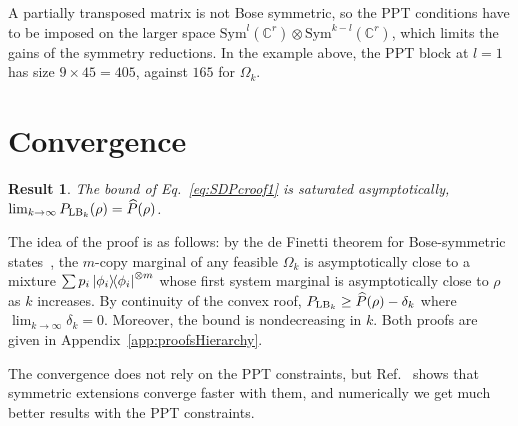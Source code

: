 \documentclass[11pt,a4paper]{report}
\newcommand{\C}{\mathds{C}}
\newtheorem{result}[theorem]{Result}
\newcounter{reptag}
\newif\iftags \tagsfalse   %
\newcommand{\reptagbox}[3]{\iftags\par\smallskip\noindent\refstepcounter{reptag}%
  \fcolorbox{#1}{#1!7}{\parbox{\dimexpr\linewidth-2\fboxsep-2\fboxrule\relax}{\small
  \textcolor{#1}{\textbf{[\thereptag]\ #2.}}\ #3}}\par\smallskip\fi}
\newcommand{\detail}[1]{\reptagbox{tagD}{More detail}{#1}}
\begin{document}
A partially transposed matrix is not Bose symmetric, so the PPT conditions have to be imposed on the larger space $\text{Sym}^l(\C^r) \otimes \text{Sym}^{k-l}(\C^r)$, which limits the gains of the symmetry reductions. In the example above, the PPT block at $l=1$ has size $9\times45=405$, against $165$ for $\Omega_k$.

\detail{Make the savings concrete with a small table of $D^k$, $\binom{k+D-1}{k}$ and $\binom{k+r-1}{k}$ for the states in the figures (e.g.\ two qutrits, $D=9$, $k=3$: $729\to165$, and $20$ for $r=4$), with the resulting memory and run time.}

\section{Convergence}
\begin{result}\label{thm:ConvergenceSDPcroof}
The bound of Eq.~\eqref{eq:SDPcroof1} is saturated asymptotically, $\lim_{k\rightarrow\infty} P_{{\rm LB}_k}(\rho) = \widehat{P}(\rho)$.
\end{result}
The idea of the proof is as follows: by the de Finetti theorem for Bose-symmetric states~\cite{caves2002unknown,Christandl_2007}, the $m$-copy marginal of any feasible $\Omega_k$ is asymptotically close to a mixture $\sum p_i \dyad{\phi_i}^{\otimes m}$ whose first system marginal is asymptotically close to $\rho$ as $k$ increases. By continuity of the convex roof, $P_{{\rm LB}_k} \geq \widehat{P}(\rho) - \delta_k$ where $\lim_{k\to \infty}\delta_k=0$. Moreover, the bound is nondecreasing in $k$. Both proofs are given in Appendix~\ref{app:proofsHierarchy}.

The convergence does not rely on the PPT constraints, but Ref.~\cite{Navascues2009} shows that symmetric extensions converge faster with them, and numerically we get much better results with the PPT constraints.

\detail{Show the convergence in practice: $P_{{\rm LB}_k}$ against $k$ for one or two states, together with the upper bound, so the reader sees how fast the gap closes and at which level memory stops you.}
\end{document}
